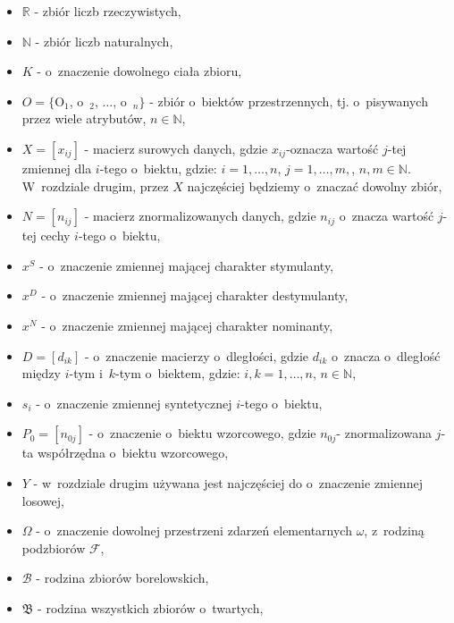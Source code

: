 \documentclass[12pt,a4paper]{report}
\newcommand{\mediana}{\operatorname{med}}
\newcommand{\licznosc}[1]{\overline{\overline{#1}}}
\begin{document}
\begin{itemize}
\item $\mathbb{R}$ - zbiór liczb rzeczywistych,
\item $\mathbb{N}$ - zbiór liczb naturalnych,
\item $K$ - o~znaczenie dowolnego ciała zbioru,
\item $O = \{$O$_{1}$, o~$_{2}$, $\dots$, o~$_{n}\}$ - zbiór o~biektów przestrzennych, tj. o~pisywanych przez wiele atrybutów, $n \in \mathbb{N}$,
\item $X=[x_{ij}]$ - macierz surowych danych, gdzie $x_{ij}$-oznacza wartość $j$-tej zmiennej dla $i$-tego o~biektu, gdzie: $i=1,\ldots,n$, $j=1,\ldots, m,$, $n,m \in \mathbb{N}$. W~rozdziale drugim, przez $X$ najczęściej będziemy o~znaczać dowolny zbiór,
\item $N=[n_{ij}]$ - macierz znormalizowanych danych, gdzie $n_{ij}$ o~znacza wartość $j$-tej cechy $i$-tego o~biektu,
\item $x^{S}$ - o~znaczenie zmiennej mającej charakter stymulanty,
\item $x^{D}$ - o~znaczenie zmiennej mającej charakter destymulanty,
\item $x^{N}$ - o~znaczenie zmiennej mającej charakter nominanty,
\item $D=[d_{ik}]$ - o~znaczenie macierzy o~dległości, gdzie $d_{ik}$ o~znacza o~dległość między $i$-tym i~$k$-tym o~biektem, gdzie: $i, k=1,\ldots,n$, $n \in \mathbb{N}$,
\item $s_{i}$ - o~znaczenie zmiennej syntetycznej $i$-tego o~biektu,
\item $P_{0}=[n_{0j}]$ - o~znaczenie o~biektu wzorcowego, gdzie $n_{0j}$- znormalizowana $j$-ta współrzędna o~biektu wzorcowego,
\item $Y$ - w~rozdziale drugim używana jest najczęściej do o~znaczenie zmiennej losowej,
\item $\Omega$ - o~znaczenie dowolnej przestrzeni zdarzeń elementarnych $\omega$, z~rodziną podzbiorów $\mathcal{F}$,
\item $\mathcal{B}$ - rodzina zbiorów borelowskich,
\item $\mathfrak{B}$ - rodzina wszystkich zbiorów o~twartych, %

\end{itemize}
\end{document}
